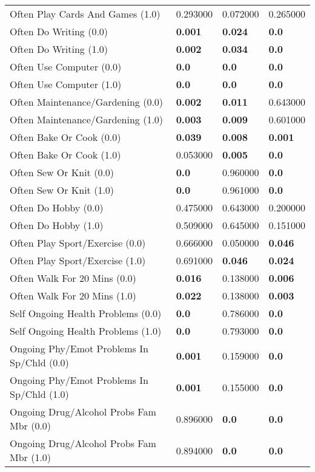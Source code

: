 \begin{tabular}{llll}
Often Play Cards And Games (1.0) & 0.293000 & 0.072000 & 0.265000 \\
Often Do Writing (0.0) & \textbf{0.001} & \textbf{0.024} & \textbf{0.0} \\
Often Do Writing (1.0) & \textbf{0.002} & \textbf{0.034} & \textbf{0.0} \\
Often Use Computer (0.0) & \textbf{0.0} & \textbf{0.0} & \textbf{0.0} \\
Often Use Computer (1.0) & \textbf{0.0} & \textbf{0.0} & \textbf{0.0} \\
Often Maintenance/Gardening (0.0) & \textbf{0.002} & \textbf{0.011} & 0.643000 \\
Often Maintenance/Gardening (1.0) & \textbf{0.003} & \textbf{0.009} & 0.601000 \\
Often Bake Or Cook (0.0) & \textbf{0.039} & \textbf{0.008} & \textbf{0.001} \\
Often Bake Or Cook (1.0) & 0.053000 & \textbf{0.005} & \textbf{0.0} \\
Often Sew Or Knit (0.0) & \textbf{0.0} & 0.960000 & \textbf{0.0} \\
Often Sew Or Knit (1.0) & \textbf{0.0} & 0.961000 & \textbf{0.0} \\
Often Do Hobby (0.0) & 0.475000 & 0.643000 & 0.200000 \\
Often Do Hobby (1.0) & 0.509000 & 0.645000 & 0.151000 \\
Often Play Sport/Exercise (0.0) & 0.666000 & 0.050000 & \textbf{0.046} \\
Often Play Sport/Exercise (1.0) & 0.691000 & \textbf{0.046} & \textbf{0.024} \\
Often Walk For 20 Mins (0.0) & \textbf{0.016} & 0.138000 & \textbf{0.006} \\
Often Walk For 20 Mins (1.0) & \textbf{0.022} & 0.138000 & \textbf{0.003} \\
Self Ongoing Health Problems (0.0) & \textbf{0.0} & 0.786000 & \textbf{0.0} \\
Self Ongoing Health Problems (1.0) & \textbf{0.0} & 0.793000 & \textbf{0.0} \\
Ongoing Phy/Emot Problems In Sp/Chld (0.0) & \textbf{0.001} & 0.159000 & \textbf{0.0} \\
Ongoing Phy/Emot Problems In Sp/Chld (1.0) & \textbf{0.001} & 0.155000 & \textbf{0.0} \\
Ongoing Drug/Alcohol Probs Fam Mbr (0.0) & 0.896000 & \textbf{0.0} & \textbf{0.0} \\
Ongoing Drug/Alcohol Probs Fam Mbr (1.0) & 0.894000 & \textbf{0.0} & \textbf{0.0} \\

\end{tabular}
